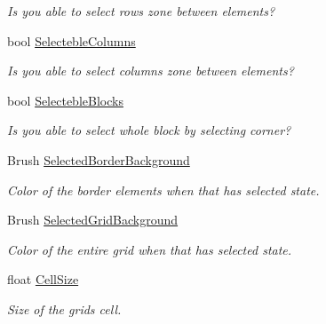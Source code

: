 \begin{DoxyCompactItemize}
\begin{DoxyCompactList}\small\item\em Is you able to select row\textquotesingle{}s zone between elements? \end{DoxyCompactList}\item 
bool \mbox{\hyperlink{class_wpf_handler_1_1_u_i_1_1_controls_1_1_selectable_grid_a283074c2acbee3d462a62b566a1f0622}{Selecteble\+Columns}}
\begin{DoxyCompactList}\small\item\em Is you able to select column\textquotesingle{}s zone between elements? \end{DoxyCompactList}\item 
bool \mbox{\hyperlink{class_wpf_handler_1_1_u_i_1_1_controls_1_1_selectable_grid_a6ae8695b895a7e0f4d1cca0f3a68c387}{Selecteble\+Blocks}}
\begin{DoxyCompactList}\small\item\em Is you able to select whole block by selecting corner? \end{DoxyCompactList}\item 
Brush \mbox{\hyperlink{class_wpf_handler_1_1_u_i_1_1_controls_1_1_selectable_grid_a9b9dcdf11b27e11e9e985eb1e9ed2356}{Selected\+Border\+Background}}
\begin{DoxyCompactList}\small\item\em Color of the border elements when that has selected state. \end{DoxyCompactList}\item 
Brush \mbox{\hyperlink{class_wpf_handler_1_1_u_i_1_1_controls_1_1_selectable_grid_a24ba51e797ef53ac12567d25ebec29bc}{Selected\+Grid\+Background}}
\begin{DoxyCompactList}\small\item\em Color of the entire grid when that has selected state. \end{DoxyCompactList}\item 
float \mbox{\hyperlink{class_wpf_handler_1_1_u_i_1_1_controls_1_1_selectable_grid_a572fdc5fcfdbc2cf1a91a8d14aa04af4}{Cell\+Size}}
\begin{DoxyCompactList}\small\item\em Size of the grid\textquotesingle{}s cell. \end{DoxyCompactList}\item 

\end{DoxyCompactItemize}
